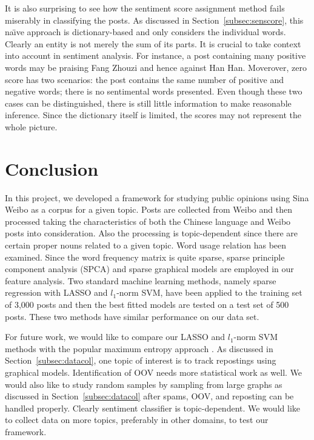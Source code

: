 \documentclass[11pt]{article}
\newcommand{\note}[1]{{\em \color{red} #1}}
\newcommand{\1}[1]{{\mathbf 1}\left\{#1\right\}}        %
\begin{document}
It is also surprising to see how the sentiment score assignment method fails miserably in classifying the posts. As discussed in Section~\ref{subsec:senscore}, this na\"\i ve approach is dictionary-based and only considers the individual words. Clearly an entity is not merely the sum of its parts. It is crucial to take context into account in sentiment analysis. For instance, a post containing many positive words may be praising Fang Zhouzi and hence against Han Han.  Moverover, zero score has two scenarios: the post contains the same number of positive  and negative words; there is no sentimental words presented. Even though these two cases can be distinguished, there is still little information to make reasonable inference. Since the dictionary itself is limited, the scores may not represent the whole picture.


\section{Conclusion}

In this project, we developed a framework for studying public opinions using Sina Weibo as a corpus for a given topic. Posts are collected from Weibo and then processed taking the characteristics of both the Chinese language and Weibo posts into consideration. Also the processing is topic-dependent since there are certain proper nouns related to a given topic.
Word usage relation has been examined. Since the word frequency matrix is quite sparse, sparse principle component analysis  (SPCA) and sparse graphical models are employed in our feature analysis. 
Two standard machine learning methods, namely sparse regression with LASSO and $l_1$-norm SVM, have been applied to the training set of 3,000 posts and then the best fitted models are tested on a test set of 500 posts. These two methods have similar performance on our data set. 

For future work, we would like to compare our LASSO and $l_1$-norm SVM methods with the popular maximum entropy approach \cite{lee2011chinese, nigam1999using}. As discussed in Section~\ref{subsec:datacol}, one topic of interest is to track repostings using graphical models. Identification of OOV needs more statistical work as well. We would also like to study random samples by sampling from large graphs as discussed in Section~\ref{subsec:datacol} after spams, OOV, and reposting can be handled properly. Clearly sentiment classifier is topic-dependent. We would like to collect data on more topics, preferably in other domains, to test our framework.
\end{document}

